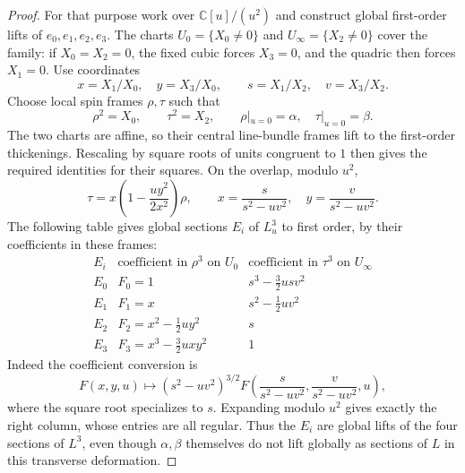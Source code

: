 \documentclass[10pt,a4paper]{amsart}
\begin{document}
\begin{proof}
For that purpose work over $\mathbb C[u]/(u^2)$ and construct global
first-order lifts of $e_0,e_1,e_2,e_3$. The charts
$U_0=\{X_0\neq0\}$ and $U_\infty=\{X_2\neq0\}$ cover the family:
if $X_0=X_2=0$, the fixed cubic forces $X_3=0$, and the quadric then
forces $X_1=0$. Use coordinates
\[
x=X_1/X_0,\quad y=X_3/X_0,\qquad
s=X_1/X_2,\quad v=X_3/X_2.
\]
Choose local spin frames $\rho,\tau$ such that
\[
\rho^2=X_0,\qquad \tau^2=X_2,\qquad
\rho|_{u=0}=\alpha,\quad\tau|_{u=0}=\beta.
\]
The two charts are affine, so their central line-bundle frames lift to
the first-order thickenings. Rescaling by square roots of units
congruent to $1$ then gives the required identities for their squares.
On the overlap, modulo $u^2$,
\begin{equation}
\label{eq:spin-transition-first-order}
\tau=x\left(1-\frac{uy^2}{2x^2}\right)\rho,
\qquad
x=\frac{s}{s^2-uv^2},\quad y=\frac{v}{s^2-uv^2}.
\end{equation}
The following table gives global sections $E_i$ of $L_u^3$ to first
order, by their coefficients in these frames:
\begin{equation}
\label{eq:global-first-order-lifts}
\begin{array}{c|c|c}
 E_i &\text{coefficient} \text{ in }\rho^3\text{ on }U_0
 &\text{coefficient in }\tau^3\text{ on }U_\infty\\ \hline
E_0&F_0=1&s^3-\frac32usv^2\\
E_1&F_1=x&s^2-\frac12uv^2\\
E_2&F_2=x^2-\frac12uy^2&s\\
E_3&F_3=x^3-\frac32uxy^2&1
\end{array}
\end{equation}
Indeed the coefficient conversion is
\[
F(x,y,u)\longmapsto
(s^2-uv^2)^{3/2}
F\left(\frac{s}{s^2-uv^2},\frac{v}{s^2-uv^2},u\right),
\]
where the square root specializes to $s$. Expanding modulo $u^2$
gives exactly the right column, whose entries are all regular.
Thus the $E_i$ are global lifts of the four sections of $L^3$,
even though $\alpha,\beta$ themselves do not lift globally as sections
of $L$ in this transverse deformation.


\end{proof}
\end{document}
